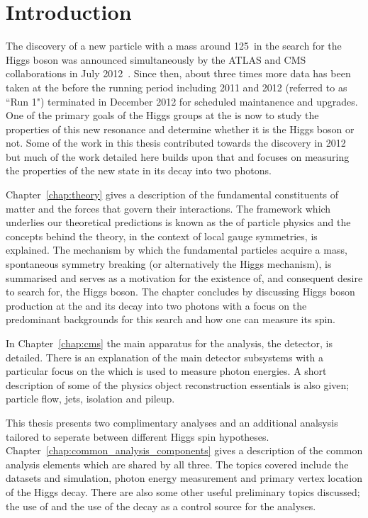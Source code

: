 \chapter{Introduction}
\label{chap:intro}

The discovery of a new particle with a mass around 125~\GeV in the search for the \SM Higgs boson was announced simultaneously by the ATLAS and CMS collaborations in July 2012~\cite{ATLASDiscovery,CMSDiscovery}. Since then, about three times more data has been taken at the \LHC before the running period including 2011 and 2012 (referred to as ``Run 1") terminated in December 2012 for scheduled maintanence and upgrades. One of the primary goals of the Higgs groups at the \LHC is now to study the properties of this new resonance and determine whether it is the \SM Higgs boson or not. Some of the work in this thesis contributed towards the discovery in 2012 but much of the work detailed here builds upon that and focuses on measuring the properties of the new state in its decay into two photons. 

Chapter~\ref{chap:theory} gives a description of the fundamental constituents of matter and the forces that govern their interactions. The framework which underlies our theoretical predictions is known as the \SM of particle physics and the concepts behind the theory, in the context of local gauge symmetries, is explained. The mechanism by which the fundamental particles acquire a mass, spontaneous symmetry breaking (or alternatively the Higgs mechanism), is summarised and serves as a motivation for the existence of, and consequent desire to search for, the Higgs boson. The chapter concludes by discussing Higgs boson production at the \LHC and its decay into two photons with a focus on the predominant backgrounds for this search and how one can measure its spin.

In Chapter~\ref{chap:cms} the main apparatus for the analysis, the \CMS detector, is detailed. There is an explanation of the main detector subsystems with a particular focus on the \ECAL which is used to measure photon energies. A short description of some of the physics object reconstruction essentials is also given; particle flow, jets, isolation and pileup.

This thesis presents two complimentary analyses and an additional analsysis tailored to seperate between different Higgs spin hypotheses. Chapter~\ref{chap:common_analysis_components} gives a description of the common analysis elements which are shared by all three. The topics covered include the datasets and \MC simulation, photon energy measurement and primary vertex location of the Higgs decay. There are also some other useful preliminary topics discussed; the use of \BDTs and the use of the \Zee decay as a control source for the \Hgg analyses.

